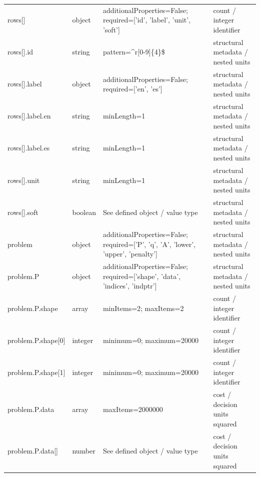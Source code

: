 \begin{longtable}{@{}>{\raggedright\arraybackslash}p{}>{\raggedright\arraybackslash}p{}>{\raggedright\arraybackslash}p{}>{\raggedright\arraybackslash}p{}@{}}
rows[] & object & additionalProperties=\allowbreak{}False; required=\allowbreak{}['id', 'label', 'unit', 'soft'] & count /\allowbreak{} integer identifier\\
rows[].\allowbreak{}id & string & pattern=\allowbreak{}\textasciicircum{}r[0-9]\{4\}\$ & structural metadata /\allowbreak{} nested units\\
rows[].\allowbreak{}label & object & additionalProperties=\allowbreak{}False; required=\allowbreak{}['en', 'es'] & structural metadata /\allowbreak{} nested units\\
rows[].\allowbreak{}label.\allowbreak{}en & string & minLength=\allowbreak{}1 & structural metadata /\allowbreak{} nested units\\
rows[].\allowbreak{}label.\allowbreak{}es & string & minLength=\allowbreak{}1 & structural metadata /\allowbreak{} nested units\\
rows[].\allowbreak{}unit & string & minLength=\allowbreak{}1 & structural metadata /\allowbreak{} nested units\\
rows[].\allowbreak{}soft & boolean & See defined object /\allowbreak{} value type & structural metadata /\allowbreak{} nested units\\
problem & object & additionalProperties=\allowbreak{}False; required=\allowbreak{}['P', 'q', 'A', 'lower', 'upper', 'penalty'] & structural metadata /\allowbreak{} nested units\\
problem.\allowbreak{}P & object & additionalProperties=\allowbreak{}False; required=\allowbreak{}['shape', 'data', 'indices', 'indptr'] & structural metadata /\allowbreak{} nested units\\
problem.\allowbreak{}P.\allowbreak{}shape & array & minItems=\allowbreak{}2; maxItems=\allowbreak{}2 & count /\allowbreak{} integer identifier\\
problem.\allowbreak{}P.\allowbreak{}shape[0] & integer & minimum=\allowbreak{}0; maximum=\allowbreak{}20000 & count /\allowbreak{} integer identifier\\
problem.\allowbreak{}P.\allowbreak{}shape[1] & integer & minimum=\allowbreak{}0; maximum=\allowbreak{}20000 & count /\allowbreak{} integer identifier\\
problem.\allowbreak{}P.\allowbreak{}data & array & maxItems=\allowbreak{}2000000 & cost /\allowbreak{} decision units squared\\
problem.\allowbreak{}P.\allowbreak{}data[] & number & See defined object /\allowbreak{} value type & cost /\allowbreak{} decision units squared\\

\end{longtable}
